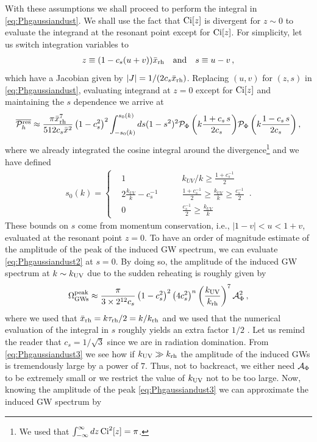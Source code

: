 \documentclass[a4paper,11pt]{article}
\numberwithin{equation}{section}
\begin{document}
With these assumptions we shall proceed to perform the integral in \eqref{eq:Phgaussiandust}. We shall use the fact that ${\rm Ci}[z]$ is divergent for $z\sim0$ to evaluate the integrand at the resonant point except for ${\rm Ci}[z]$. For simplicity, let us switch integration variables to
\begin{align}
z\equiv(1-c_s(u+v))\bar x_{\rm rh}\quad{\rm and}\quad s\equiv u-v\,,
\end{align}
which have a Jacobian given by $|J|=1/(2c_s\bar x_{\rm rh})$. Replacing $(u,v)$ for $(z,s)$ in \eqref{eq:Phgaussiandust}, evaluating integrand at $z=0$ except for ${\rm Ci}[z]$ and maintaining the $s$ dependence we arrive at
\begin{align}\label{eq:Phgaussiandust2}
\overline{{\cal P}^{\rm res}_h}\approx\frac{\pi{\bar x_{\rm rh}^7}}{512c_s\bar x^2}\left(1-c_s^2\right)^2\int_{-s_0(k)}^{s_0(k)} ds {(1-s^2)^2}{{\cal P}_{\Phi}\left(k\frac{1+c_s\,s}{2c_s}\right)}{{\cal P}_{\Phi}\left(k\frac{1-c_s\,s}{2c_s}\right)}\,,
\end{align}
where we already integrated the cosine integral around the divergence\footnote{We used that $\int_{-\infty}^\infty dz\,{\rm Ci}^2[z]=\pi$.
} and we have defined \cite{Inomata:2019ivs}
\begin{align}\label{eq:s0}
s_0(k)=\left\{
\begin{aligned}
&1\qquad &{k_{UV}}/{k}\geq\tfrac{1+c_s^{-1}}{2}\\
&2\tfrac{k_{UV}}{k}-c_s^{-1}\qquad & \tfrac{1+c_s^{-1}}{2}\geq\tfrac{k_{UV}}{k}\geq\tfrac{c_s^{-1}}{2}\\
&0\qquad &\tfrac{c_s^{-1}}{2}\geq\tfrac{k_{UV}}{k}
\end{aligned}
\right.\,.
\end{align}
These bounds on $s$ come from momentum conservation, i.e., $|1-v|<u<1+v$, evaluated at the resonant point $z=0$. To have an order of magnitude estimate of the amplitude of the peak of the induced GW spectrum, we can evaluate \eqref{eq:Phgaussiandust2} at $s=0$. By doing so, the amplitude of the induced GW spectrum at $k\sim k_{\rm UV}$ due to the sudden reheating is roughly given by
\begin{align}\label{eq:Phgaussiandust3}
\Omega^{\rm peak}_{\rm GWs}\approx\frac{\pi}{3\times 2^{12}c_s}\left(1-c_s^2\right)^2\left({4c^2_s}\right)^{n}\left(\frac{k_{\rm UV}}{k_{\rm rh}}\right)^7{\cal A}^2_{\Phi}\,,
\end{align}
where we used that $\bar x_{\rm rh}=k\tau_{\rm rh}/2=k/k_{\rm rh}$ and we used that the numerical evaluation of the integral in $s$ roughly yields an extra factor $1/2$ \cite{Domenech:2020ssp}. Let us remind the reader that $c_s=1/\sqrt{3}$ since we are in radiation domination. From \eqref{eq:Phgaussiandust3} we see how if $k_{\rm UV}\gg k_{\rm rh}$ the amplitude of the induced GWs is tremendously large by a power of $7$. Thus, not to backreact, we either need ${\cal A}_{\Phi}$ to be extremely small or we restrict the value of $k_{\rm UV}$ not to be too large. Now, knowing the amplitude of the peak \eqref{eq:Phgaussiandust3} we can approximate the induced GW spectrum by
\end{document}
